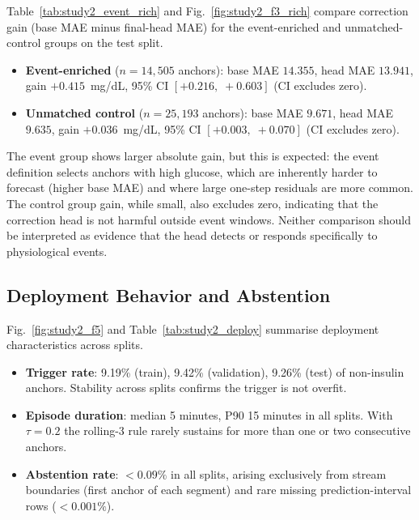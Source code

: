 Table~\ref{tab:study2_event_rich} and Fig.~\ref{fig:study2_f3_rich} compare
correction gain (base MAE minus final-head MAE) for the event-enriched and
unmatched-control groups on the test split.

\begin{itemize}
  \item \textbf{Event-enriched} ($n=14{,}505$ anchors):
        base MAE $14.355$, head MAE $13.941$,
        gain $+0.415$~mg/dL,
        95\% CI $[+0.216,\;+0.603]$ (CI excludes zero).
  \item \textbf{Unmatched control} ($n=25{,}193$ anchors):
        base MAE $9.671$, head MAE $9.635$,
        gain $+0.036$~mg/dL,
        95\% CI $[+0.003,\;+0.070]$ (CI excludes zero).
\end{itemize}

The event group shows larger absolute gain, but this is expected:
the event definition selects anchors with high glucose, which are
inherently harder to forecast (higher base MAE) and where large
one-step residuals are more common.
The control group gain, while small, also excludes zero, indicating
that the correction head is not harmful outside event windows.
Neither comparison should be interpreted as evidence that the head
detects or responds specifically to physiological events.

\subsection{Deployment Behavior and Abstention}
\label{subsec:study2_deploy}

Fig.~\ref{fig:study2_f5} and Table~\ref{tab:study2_deploy} summarise
deployment characteristics across splits.

\begin{itemize}
  \item \textbf{Trigger rate}: 9.19\% (train), 9.42\% (validation),
        9.26\% (test) of non-insulin anchors.
        Stability across splits confirms the trigger is not overfit.
  \item \textbf{Episode duration}: median 5 minutes, P90 15 minutes
        in all splits.
        With $\tau=0.2$ the rolling-3 rule rarely sustains for more than
        one or two consecutive anchors.
  \item \textbf{Abstention rate}: $< 0.09\%$ in all splits, arising
        exclusively from stream boundaries (first anchor of each segment)
        and rare missing prediction-interval rows ($< 0.001\%$).
\end{itemize}

